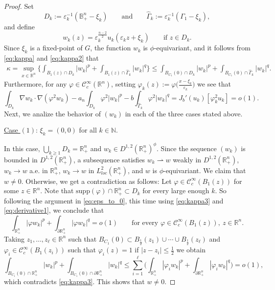 \documentclass[10pt,a4paper]{amsart}
\def\D{\mathbb{B}^n_+}
\def\cC{\mathcal{C}}
\def\eps{\varepsilon}
\def\hn{\mathbb{R}^n_+}
\def\idhn{\int_{\partial\hn}}
\def\ihn{\int_{\hn}}
\def\n{\mathbb{N}}
\def\rh{\rightharpoonup}
\def\rn{\mathbb{R}^n}
\def\supp{\mathrm{supp}}
\def\vp{\varphi}
\def\what{\widehat}
\begin{document}
\begin{proof}
Set
$$D_k:=\eps_k^{-1}(\D-\xi_k)\qquad\text{and}\qquad\what\Gamma_k:=\eps_k^{-1}(\Gamma_1-\xi_k),$$
and define
$$w_k(z)=\eps_k^\frac{n-2}{2}u_k(\eps_kz+\xi_k)\qquad\text{if \ }z\in D_k.$$
Since $\xi_k$ is a fixed-point of $G$, the function $w_k$ is $\phi$-equivariant, and it follows from \eqref{eq:kappa} and \eqref{eq:kappa2} that
\begin{align} \label{eq:kappa3}
\kappa =\sup_{x\in\rn}\Big\{\int_{B_1(z)\cap D_k}|w_k|^p+\int_{B_1(z)\cap\what\Gamma_k}|w_k|^q\Big\}\leq \int_{B_{C_1}(0)\cap D_k}|w_k|^p+\int_{B_{C_1}(0)\cap\what\Gamma_k}|w_k|^q.
\end{align}
Furthermore, for any $\vp\in\cC^\infty_c(\rn)$, setting $\vp_k(z):=\vp\big(\frac{x-\xi_k}{\eps_k}\big)$ we see that
\begin{equation}\label{eq:derivative1}
\int_{D_k}\nabla w_k\cdot\nabla(\vp^2w_k)-a_n\int_{D_k}\vp^2|w_k|^p-b\int_{\what\Gamma_k}\vp^2|w_k|^q = J_b'(u_k)[\vp_k^2u_k]=o(1).
\end{equation}
Next, we analize the behavior of $(w_k)$ in each of the three cases stated above.

\underline{Case $(1)$}: $\xi_k=(0,0)$ for all $k\in\n$.

In this case, $\bigcup_{k\geq 1}D_k=\hn$ and $w_k\in D^{1,2}(\hn)^\phi$. Since the sequence $(w_k)$ is bounded in $D^{1,2}(\hn)$, a subsequence satisfies $w_k\rh w$ weakly in $D^{1,2}(\hn)$, $w_k\to w$ a.e. in $\hn$, $w_k\to w$ in $L^2_{loc}(\hn)$, and $w$ is $\phi$-equivariant. We claim that $w\neq 0$. Otherwise, we get a contradiction as follows: Let $\vp\in\cC^\infty_c(B_1(z))$ for some $z\in\rn$. Note that $\supp(\vp)\cap\hn\subset D_k$ for every large enough $k$. So following the argument in \eqref{eq:eps_to_0}, this time using \eqref{eq:kappa3} and \eqref{eq:derivative1}, we conclude that 
$$\ihn|\vp w_k|^p+\idhn|\vp w_k|^q = o(1)\qquad\text{for every \ }\vp\in\cC^\infty_c(B_1(z)), \ z\in\rn.$$
Taking $z_1,\ldots,z_\ell\in\rn$ such that $B_{C_1}(0)\subset B_\frac{1}{2}(z_1)\cup\cdots\cup B_\frac{1}{2}(z_\ell)$ and $\vp_i\in\cC^\infty_c(B_1(z_i))$ such that $\vp_i(z)=1$ if $|z-z_i|\leq\frac{1}{2}$ we obtain
$$\int_{B_{C_1}(0)\cap \hn}|w_k|^p+\int_{B_{C_1}(0)\cap\partial\hn}|w_k|^q\leq\sum_{i=1}^\ell\Big(\ihn|\vp_iw_k|^p+\idhn|\vp_iw_k|^q\Big)=o(1),$$
which contradicts \eqref{eq:kappa3}. This shows that $w\neq 0$.


\end{proof}
\end{document}
